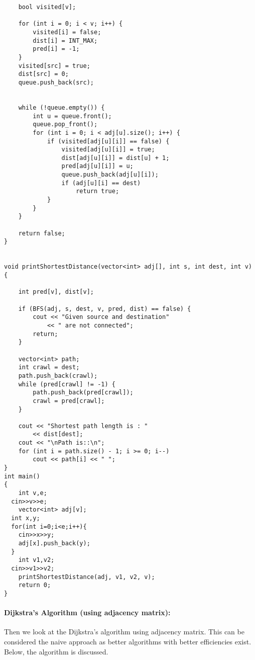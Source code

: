 \documentclass[10pt]{article}
\begin{document}
\begin{multicols*}{2}
\begin{lstlisting}
	bool visited[v];

	for (int i = 0; i < v; i++) {
		visited[i] = false;
		dist[i] = INT_MAX;
		pred[i] = -1;
	}
	visited[src] = true;
	dist[src] = 0;
	queue.push_back(src);


	while (!queue.empty()) {
		int u = queue.front();
		queue.pop_front();
		for (int i = 0; i < adj[u].size(); i++) {
			if (visited[adj[u][i]] == false) {
				visited[adj[u][i]] = true;
				dist[adj[u][i]] = dist[u] + 1;
				pred[adj[u][i]] = u;
				queue.push_back(adj[u][i]);
				if (adj[u][i] == dest)
					return true;
			}
		}
	}

	return false;
}


void printShortestDistance(vector<int> adj[], int s, int dest, int v)
{

	int pred[v], dist[v];

	if (BFS(adj, s, dest, v, pred, dist) == false) {
		cout << "Given source and destination"
			<< " are not connected";
		return;
	}

	vector<int> path;
	int crawl = dest;
	path.push_back(crawl);
	while (pred[crawl] != -1) {
		path.push_back(pred[crawl]);
		crawl = pred[crawl];
	}

	cout << "Shortest path length is : "
		<< dist[dest];
	cout << "\nPath is::\n";
	for (int i = path.size() - 1; i >= 0; i--)
		cout << path[i] << " ";
}
int main()
{
	int v,e;
  cin>>v>>e;
	vector<int> adj[v];
  int x,y;
  for(int i=0;i<e;i++){
    cin>>x>>y;
    adj[x].push_back(y);
  }
	int v1,v2;
  cin>>v1>>v2;
	printShortestDistance(adj, v1, v2, v);
	return 0;
}

\end{lstlisting}

\paragraph{Dijkstra's Algorithm (using adjacency matrix):}
Then we look at the Dijkstra's algorithm using adjacency matrix. This can be considered the naive approach as better algorithms with better efficiencies exist. Below, the algorithm is discussed.\\



\end{multicols*}
\end{document}
